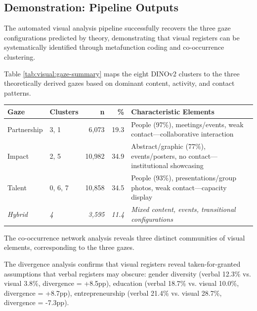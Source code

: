 \documentclass[../main.tex]{subfiles}
\begin{document}
\subsection{Demonstration: Pipeline Outputs}

\begin{insightbox}
The automated visual analysis pipeline successfully recovers the three gaze configurations predicted by theory, demonstrating that visual registers can be systematically identified through metafunction coding and co-occurrence clustering.
\end{insightbox}

Table \ref{tab:visual:gaze-summary} maps the eight DINOv2 clusters to the three theoretically derived gazes based on dominant content, activity, and contact patterns.

\begin{center}
\small
\begin{tabular}{llrrp{5cm}}
\toprule
\textbf{Gaze} & \textbf{Clusters} & \textbf{n} & \textbf{\%} & \textbf{Characteristic Elements} \\
\midrule
Partnership & 3, 1 & 6,073 & 19.3 & People (97\%), meetings/events, weak contact---collaborative interaction \\
Impact & 2, 5 & 10,982 & 34.9 & Abstract/graphic (77\%), events/posters, no contact---institutional showcasing \\
Talent & 0, 6, 7 & 10,858 & 34.5 & People (93\%), presentations/group photos, weak contact---capacity display \\
\textit{Hybrid} & \textit{4} & \textit{3,595} & \textit{11.4} & \textit{Mixed content, events, transitional configurations} \\
\bottomrule
\end{tabular}
\end{center}

The co-occurrence network analysis reveals three distinct communities of visual elements, corresponding to the three gazes.


The divergence analysis confirms that visual registers reveal taken-for-granted assumptions that verbal registers may obscure: gender diversity (verbal 12.3\% vs. visual 3.8\%, divergence = +8.5pp), education (verbal 18.7\% vs. visual 10.0\%, divergence = +8.7pp), entrepreneurship (verbal 21.4\% vs. visual 28.7\%, divergence = -7.3pp).
\end{document}
